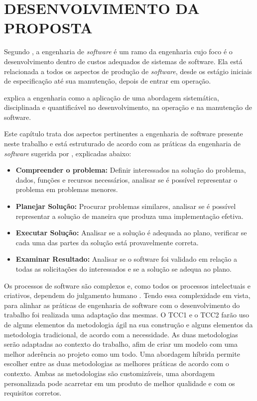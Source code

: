 
\chapter[Desenvolvimento da Proposta]{DESENVOLVIMENTO DA PROPOSTA}



Segundo \cite{sommerville2003engenharia} , a  engenharia de \textit{software} é um ramo da engenharia cujo foco é o desenvolvimento dentro de custos adequados de sistemas de software. Ela está relacionada a todos os aspectos de produção de \textit{software}, desde os estágio iniciais de especificação até sua manutenção, depois de entrar em operação. 

\cite{pressman2009engenharia} explica a engenharia como a aplicação de uma abordagem sistemática, disciplinada e quantificável no desenvolvimento, na operação e na manutenção de software.

Este capítulo trata dos aspectos pertinentes a engenharia de software presente neste trabalho e está estruturado de acordo com as práticas da engenharia de \textit{software} sugerida por \cite{pressman2009engenharia}, explicadas abaixo:

\begin{itemize}
\item  \textbf {Compreender o problema:} Definir interessados na solução do problema, dados, funções e recursos necessários, analisar se é possível representar o problema em problemas menores.
\item  \textbf {Planejar Solução:} Procurar problemas similares, analisar se é possível representar a solução de maneira que produza uma implementação efetiva. 
\item  \textbf {Executar Solução:} Analisar se a solução é adequada ao plano, verificar se cada uma das partes da solução está provavelmente correta. 
\item  \textbf {Examinar Resultado:} Analisar se o software foi validado em relação a todas as solicitações do interessados e se a solução se adequa ao plano.
\end{itemize}


 Os processos de software são complexos e, como todos os processos intelectuais e criativos, dependem do julgamento humano \cite{sommerville2003engenharia}. Tendo essa complexidade em vista, para alinhar as práticas de engenharia de software com o desenvolvimento do trabalho foi realizada uma adaptação das  mesmas. O TCC1 e o TCC2 farão uso de alguns elementos da metodologia ágil na sua construção e alguns elementos da metodologia tradicional, de acordo com a necessidade. As duas metodologias serão adaptadas ao contexto do trabalho, afim de criar um modelo com uma melhor aderência ao projeto como um todo. Uma abordagem híbrida permite escolher entre as duas metodologias as melhores práticas de acordo com o contexto. Ambas as metodologias são customizáveis, uma abordagem personalizada pode acarretar em um produto de melhor qualidade e com os requisitos corretos.

